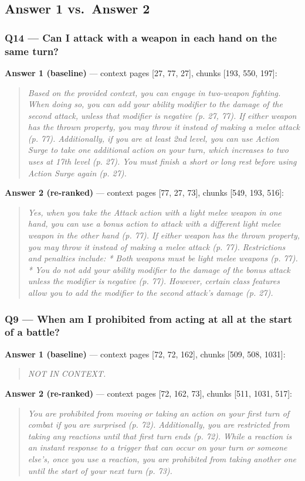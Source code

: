 \documentclass[11pt,a4paper]{article}
\begin{document}
\subsection{Answer 1 vs.\ Answer 2}
\subsubsection*{Q14 --- Can I attack with a weapon in each hand on the same turn?}
\textbf{Answer 1 (baseline)} --- context pages [27, 77, 27], chunks [193, 550, 197]:
\begin{quote}\itshape Based on the provided context, you can engage in two-weapon fighting. When doing so, you can add your ability modifier to the damage of the second attack, unless that modifier is negative (p. 27, 77). If either weapon has the thrown property, you may throw it instead of making a melee attack (p. 77). Additionally, if you are at least 2nd level, you can use Action Surge to take one additional action on your turn, which increases to two uses at 17th level (p. 27). You must finish a short or long rest before using Action Surge again (p. 27).\end{quote}
\textbf{Answer 2 (re-ranked)} --- context pages [77, 27, 73], chunks [549, 193, 516]:
\begin{quote}\itshape Yes, when you take the Attack action with a light melee weapon in one hand, you can use a bonus action to attack with a different light melee weapon in the other hand (p. 77). If either weapon has the thrown property, you may throw it instead of making a melee attack (p. 77). Restrictions and penalties include: * Both weapons must be light melee weapons (p. 77). * You do not add your ability modifier to the damage of the bonus attack unless the modifier is negative (p. 77). However, certain class features allow you to add the modifier to the second attack's damage (p. 27).\end{quote}

\subsubsection*{Q9 --- When am I prohibited from acting at all at the start of a battle?}
\textbf{Answer 1 (baseline)} --- context pages [72, 72, 162], chunks [509, 508, 1031]:
\begin{quote}\itshape NOT IN CONTEXT.\end{quote}
\textbf{Answer 2 (re-ranked)} --- context pages [72, 162, 73], chunks [511, 1031, 517]:
\begin{quote}\itshape You are prohibited from moving or taking an action on your first turn of combat if you are surprised (p. 72). Additionally, you are restricted from taking any reactions until that first turn ends (p. 72). While a reaction is an instant response to a trigger that can occur on your turn or someone else's, once you use a reaction, you are prohibited from taking another one until the start of your next turn (p. 73).\end{quote}
\end{document}
